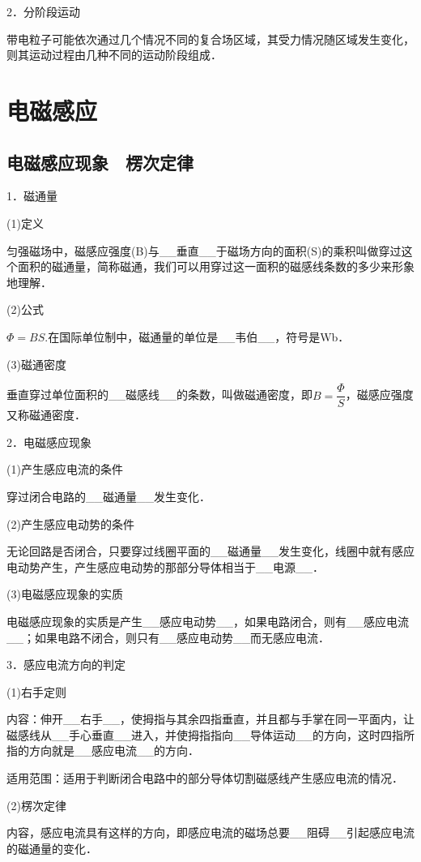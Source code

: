 \documentclass[cn,10.5pt,chinese,mac,chinesefont=founder]{elegantbook}
\begin{document}
2．分阶段运动

带电粒子可能依次通过几个情况不同的复合场区域，其受力情况随区域发生变化，则其运动过程由几种不同的运动阶段组成．


\chapter{电磁感应}
\section{电磁感应现象　楞次定律}

1．磁通量

(1)定义

匀强磁场中，磁感应强度(B)与\_\_垂直\_\_于磁场方向的面积(S)的乘积叫做穿过这个面积的磁通量，简称磁通，我们可以用穿过这一面积的磁感线条数的多少来形象地理解．

(2)公式

$\Phi=BS.$在国际单位制中，磁通量的单位是\_\_韦伯\_\_，符号是Wb．

(3)磁通密度

垂直穿过单位面积的\_\_磁感线\_\_的条数，叫做磁通密度，即$B=\dfrac{\Phi}{S}$，磁感应强度又称磁通密度．

2．电磁感应现象

(1)产生感应电流的条件

穿过闭合电路的\_\_磁通量\_\_发生变化．

(2)产生感应电动势的条件

无论回路是否闭合，只要穿过线圈平面的\_\_磁通量\_\_发生变化，线圈中就有感应电动势产生，产生感应电动势的那部分导体相当于\_\_电源\_\_．

(3)电磁感应现象的实质

电磁感应现象的实质是产生\_\_感应电动势\_\_，如果电路闭合，则有\_\_感应电流\_\_；如果电路不闭合，则只有\_\_感应电动势\_\_而无感应电流．

3．感应电流方向的判定

(1)右手定则

内容：伸开\_\_右手\_\_，使拇指与其余四指垂直，并且都与手掌在同一平面内，让磁感线从\_\_手心垂直\_\_进入，并使拇指指向\_\_导体运动\_\_的方向，这时四指所指的方向就是\_\_感应电流\_\_的方向．

适用范围：适用于判断闭合电路中的部分导体切割磁感线产生感应电流的情况．

(2)楞次定律

内容，感应电流具有这样的方向，即感应电流的磁场总要\_\_阻碍\_\_引起感应电流的磁通量的变化．
\end{document}
